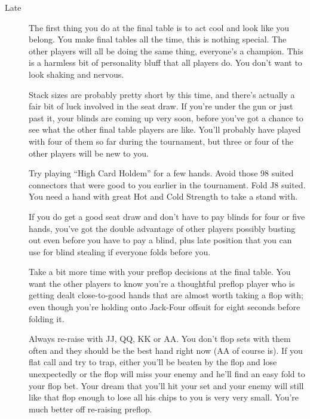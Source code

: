 \begin{description}
\item[Late] The first thing you do at the final table is to act cool
and look like you belong. You make final tables all the time, this is
nothing special. The other players will all be doing the same
thing, everyone's a champion. This is a harmless bit of personality
bluff that all players do. You don't want to look shaking and
nervous.

Stack sizes are probably pretty short by this time, and there's
actually a fair bit of luck involved in the seat draw. If you're under
the gun or just past it, your blinds are coming up very soon, before
you've got a chance to see what the other final table players are
like. You'll probably have played with four of them so far during the
tournament, but three or four of the other players will be new to
you.

Try playing ``High Card Holdem'' for a few hands. Avoid those 98
suited connectors that were good to you earlier in the
tournament. Fold J8 suited. You need a hand with great Hot and Cold
Strength to take a stand with.

If you do get a good seat draw and don't have to pay blinds for four
or five hands, you've got the double advantage of other players
possibly busting out even before you have to pay a blind, plus late
position that you can use for blind stealing if everyone folds before
you.

Take a bit more time with your preflop decisions at the final
table. You want the other players to know you're a thoughtful preflop
player who is getting dealt close-to-good hands that are almost worth
taking a flop with; even though you're holding onto Jack-Four offsuit
for eight seconds before folding it.

Always re-raise with JJ, QQ, KK or AA. You don't flop sets with them
often and they should be the best hand right now (AA of course
is). If you flat call and try to trap, either you'll be beaten by the
flop and lose unexpectedly or the flop will miss your enemy and he'll
find an easy fold to your flop bet. Your dream that you'll hit your
set and your enemy will still like that flop enough to lose all his
chips to you is very very small. You're much better off re-raising
preflop.

\end{description}
